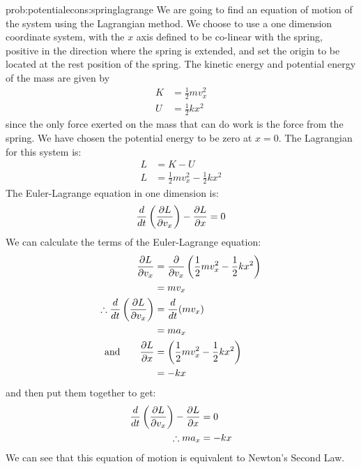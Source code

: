 \begin{solution}{prob:potentialecons:springlagrange}\label{soln:potentialecons:springlagrange} We are going to find an equation of motion of the system using the Lagrangian method. We choose to use a one dimension coordinate system, with the $x$ axis defined to be co-linear with the spring, positive in the direction where the spring is extended, and set the origin to be located at the rest position of the spring. The kinetic energy and potential energy of the mass are given by
\begin{align*}
K&=\frac{1}{2}mv_x^2\\
U&=\frac{1}{2}kx^2
\end{align*}
since the only force exerted on the mass that can do work is the force from the spring. We have chosen the potential energy to be zero at $x=0$. The Lagrangian for this system is:
\begin{align*}
L&=K-U\\
L&=\frac{1}{2}mv_x^2-\frac{1}{2}kx^2
\end{align*}
The Euler-Lagrange equation in one dimension is:
\begin{align*}
\frac{d}{dt}\left(\frac{\partial L}{\partial v_x}\right)-\frac{\partial L}{\partial x} = 0
\end{align*}
We can calculate the terms of the Euler-Lagrange equation:
\begin{align*}
\frac{\partial L}{\partial v_x}&=\frac{\partial }{\partial v_x}\left(\frac{1}{2}mv_x^2-\frac{1}{2}kx^2\right)\\
&=mv_x\\
\therefore \frac{d}{dt}\left(\frac{\partial L}{\partial v_x}\right)&=\frac{d}{dt}(mv_x)\\
&=ma_x\\
\textrm{and}\qquad \frac{\partial L}{\partial x}&=\left(\frac{1}{2}mv_x^2-\frac{1}{2}kx^2\right)\\
&=-kx
\end{align*}
and then put them together to get:
\begin{align*}
\frac{d}{dt}\left(\frac{\partial L}{\partial v_x}\right)-\frac{\partial L}{\partial x} &= 0\\
\therefore ma_x&=-kx\\
\end{align*}
We can see that this equation of motion is equivalent to Newton's Second Law.
\end{solution}

